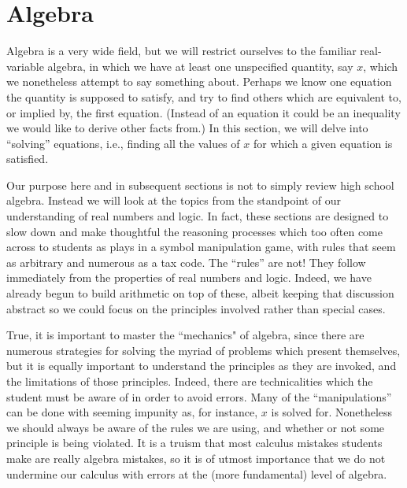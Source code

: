 \vfill\eject







\section{Algebra}
Algebra is a very wide field, but we will restrict ourselves
to the familiar real-variable algebra, in which we have at least one
unspecified quantity, say $x$, which we nonetheless attempt
to say something about.  Perhaps we know one equation the
quantity is supposed to satisfy, and try to find others
which are equivalent to,  or implied by, the first equation.
(Instead of an equation it could be an inequality we would
like to derive other facts from.)
In this section, we will delve into
``solving'' equations, i.e., finding all the values of
$x$ for which a given equation is satisfied.

Our purpose here and in subsequent sections
is not to simply review high school algebra.
Instead we will look at the topics from the standpoint
of our understanding of real numbers and logic.
In fact, these sections are
designed to slow down and make thoughtful the 
reasoning processes which too often come across to students
as plays in a symbol manipulation game, with rules that seem
as arbitrary and numerous as a tax code. The ``rules''
are not!  They follow immediately from the properties
of real numbers and logic.  Indeed, we have already 
begun to build arithmetic on top of these, albeit keeping
that discussion abstract so we could focus on the
principles involved rather than special cases.

True, it is important to master the ``mechanics" of algebra, since
there are numerous strategies for solving the myriad of 
problems which present themselves, but it is
equally important to understand the principles as they are invoked,
and the limitations of those principles.  Indeed, there are technicalities
which the student must be aware of in order to avoid errors.
  Many of the ``manipulations'' can be done with seeming impunity
as, for instance,  $x$ is solved for. Nonetheless we
should always be aware of the rules we are using, and whether
or not some principle is being violated.  It is a truism that
most calculus mistakes students make are really algebra mistakes,
so it is of utmost importance that we do not undermine
our calculus with errors at the (more fundamental) level of algebra.
 
